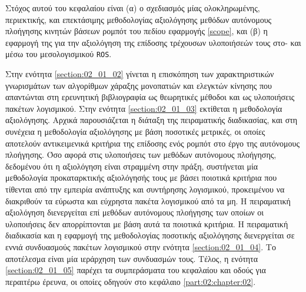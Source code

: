 Στόχος αυτού του κεφαλαίου είναι (α) ο σχεδιασμός μίας ολοκληρωμένης,
περιεκτικής, και επεκτάσιμης μεθοδολογίας αξιολόγησης μεθόδων αυτόνομους
πλοήγησης κινητών βάσεων ρομπότ του πεδίου εφαρμογής \ref{scope}, και (β) η
εφαρμογή της για την αξιολόγηση της επίδοσης τρέχουσων υλοποιήσεών τους στο- και
μέσω του μεσολογισμικού \texttt{ROS}.

Στην ενότητα \ref{section:02_01_02} γίνεται η επισκόπηση των χαρακτηριστικών
γνωρισμάτων των αλγορίθμων χάραξης μονοπατιών και ελεγκτών κίνησης που
απαντώνται στη ερευνητική βιβλιογραφία ως θεωρητικές μέθοδοι και ως υλοποιήσεις
πακέτων λογισμικού. Στην ενότητα \ref{section:02_01_03} εκτίθεται η μεθοδολογία
αξιολόγησης. Αρχικά παρουσιάζεται η διάταξη της πειραματικής διαδικασίας, και
στη συνέχεια η μεθοδολογία αξιολόγησης με βάση ποσοτικές μετρικές, οι οποίες
αποτελούν αντικειμενικά κριτήρια της επίδοσης ενός ρομπότ στο έργο της
αυτόνομους πλοήγησης. Όσο αφορά στις υλοποιήσεις των μεθόδων αυτόνομους
πλοήγησης, δεδομένου ότι η αξιολόγηση είναι στραμμένη στην πράξη, συστήνεται
μία μεθοδολογία προκαταρκτικής αξιολόγησής τους με βάσει ποιοτικά κριτήρια που
τίθενται από την εμπειρία ανάπτυξης και συντήρησης λογισμικού, προκειμένου να
διακριθούν τα εύρωστα και εύχρηστα πακέτα λογισμικού από τα μη.  Η πειραματική
αξιολόγηση διενεργείται επί μεθόδων αυτόνομους πλοήγησης των οποίων οι
υλοποιήσεις δεν απορρίπτονται με βάση αυτά τα ποιοτικά κριτήρια. Η πειραματική
διαδικασία και η εφαρμογή της μεθοδολογίας ποσοτικής αξιολόγησης διενεργείται
σε εννιά συνδυασμούς πακέτων λογισμικού στην ενότητα \ref{section:02_01_04}. Το
αποτέλεσμα είναι μία ιεράρχηση των συνδυασμών τους.  Τέλος, η ενότητα
\ref{section:02_01_05} παρέχει τα συμπεράσματα του κεφαλαίου και οδούς για
περαιτέρω έρευνα, οι οποίες οδηγούν στο κεφάλαιο \ref{part:02:chapter:02}.
